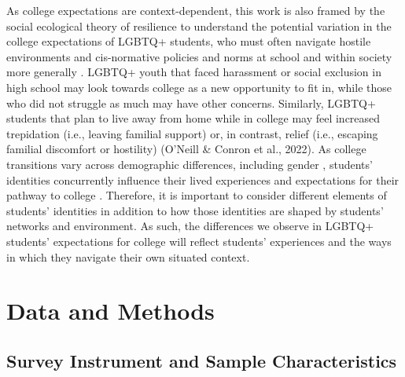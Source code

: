 As college expectations are context-dependent, this work is also framed
by the social ecological theory of resilience \citep{ungar2011a} to
understand the potential variation in the college expectations of LGBTQ+
students, who must often navigate hostile environments and cis-normative
policies and norms at school and within society more generally \citep{kosciw2022a}. LGBTQ+ youth that faced harassment or social exclusion in
high school may look towards college as a new opportunity to fit in,
while those who did not struggle as much may have other concerns.
Similarly, LGBTQ+ students that plan to live away from home while in
college may feel increased trepidation (i.e., leaving familial support)
or, in contrast, relief (i.e., escaping familial discomfort or
hostility) (O'Neill \& Conron et al., 2022). As college transitions vary
across demographic differences, including gender \citep{means2016a, toutkoushian2018a}, students' identities concurrently influence
their lived experiences and expectations for their pathway to college
\citep{feldman2022a, fotopoulou2012a}. Therefore, it is important to
consider different elements of students' identities in addition to how
those identities are shaped by students' networks and environment. As
such, the differences we observe in LGBTQ+ students' expectations for
college will reflect students' experiences and the ways in which they
navigate their own situated context.

\section{Data and Methods}\label{data-and-methods}

\subsection{Survey Instrument and Sample Characteristics}\label{survey-instrument-and-sample-characteristics}

